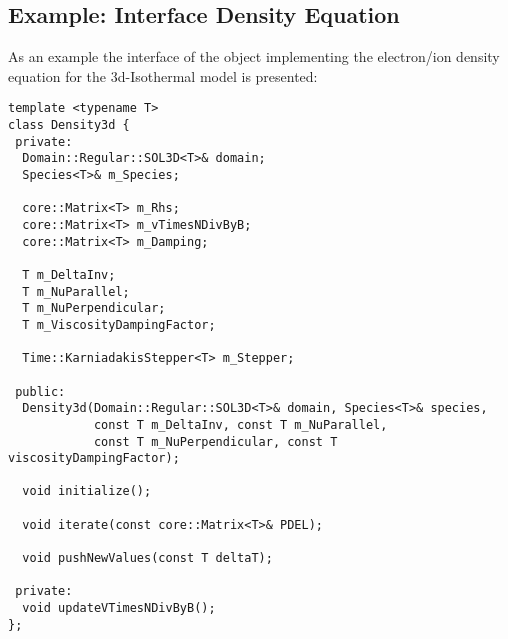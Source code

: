 \documentclass[master.tex]{subfiles}
\begin{document}
\subsection{Example: Interface Density Equation}
As an example the interface of the object implementing the electron/ion density equation for the 3d-Isothermal model is presented:

\begin{lstlisting}
template <typename T>
class Density3d {
 private:
  Domain::Regular::SOL3D<T>& domain;
  Species<T>& m_Species;

  core::Matrix<T> m_Rhs;
  core::Matrix<T> m_vTimesNDivByB;
  core::Matrix<T> m_Damping;

  T m_DeltaInv;
  T m_NuParallel;
  T m_NuPerpendicular;
  T m_ViscosityDampingFactor;

  Time::KarniadakisStepper<T> m_Stepper;

 public:
  Density3d(Domain::Regular::SOL3D<T>& domain, Species<T>& species,
            const T m_DeltaInv, const T m_NuParallel,
            const T m_NuPerpendicular, const T viscosityDampingFactor);

  void initialize();

  void iterate(const core::Matrix<T>& PDEL);

  void pushNewValues(const T deltaT);

 private:
  void updateVTimesNDivByB();
};
\end{lstlisting}
\end{document}
